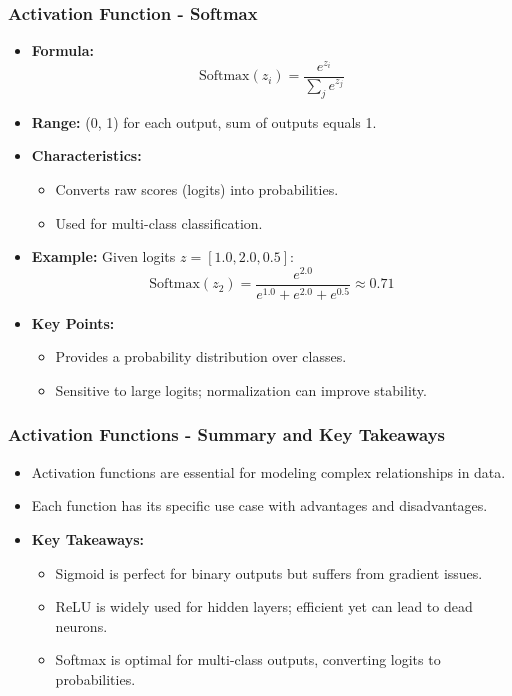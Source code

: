 \documentclass{beamer}
\begin{document}
\begin{frame}[fragile]
    \frametitle{Activation Function - Softmax}
    \begin{itemize}
        \item \textbf{Formula:}
        \begin{equation}
            \text{Softmax}(z_i) = \frac{e^{z_i}}{\sum_{j} e^{z_j}}
        \end{equation}
        \item \textbf{Range:} (0, 1) for each output, sum of outputs equals 1.
        \item \textbf{Characteristics:}
        \begin{itemize}
            \item Converts raw scores (logits) into probabilities.
            \item Used for multi-class classification.
        \end{itemize}
        \item \textbf{Example:}
        Given logits \( z = [1.0, 2.0, 0.5] \):
        \begin{equation}
            \text{Softmax}(z_2) = \frac{e^{2.0}}{e^{1.0} + e^{2.0} + e^{0.5}} \approx 0.71
        \end{equation}
        \item \textbf{Key Points:}
        \begin{itemize}
            \item Provides a probability distribution over classes.
            \item Sensitive to large logits; normalization can improve stability.
        \end{itemize}
    \end{itemize}
\end{frame}

\begin{frame}[fragile]
    \frametitle{Activation Functions - Summary and Key Takeaways}
    \begin{itemize}
        \item Activation functions are essential for modeling complex relationships in data.
        \item Each function has its specific use case with advantages and disadvantages.
        \item \textbf{Key Takeaways:}
        \begin{itemize}
            \item Sigmoid is perfect for binary outputs but suffers from gradient issues.
            \item ReLU is widely used for hidden layers; efficient yet can lead to dead neurons.
            \item Softmax is optimal for multi-class outputs, converting logits to probabilities.
        \end{itemize}
    \end{itemize}
\end{frame}
\end{document}
